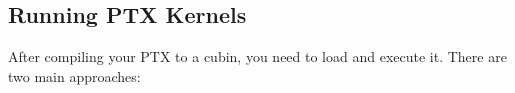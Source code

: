 \subsection{Running PTX Kernels}

After compiling your PTX to a cubin, you need to load and execute it. There are two main approaches:

